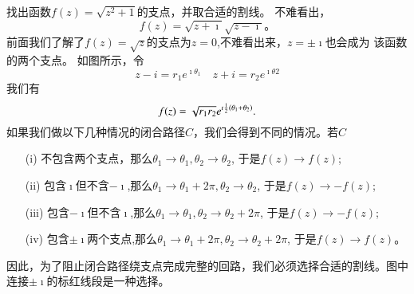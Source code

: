 \begin{examplebox}{找出函数$f(z) = \sqrt{z^2 + 1}$的支点，并取合适的割线。}
不难看出，
\[
  f(z) = \sqrt{z + \imath} \sqrt{z-\imath} 。
\]
前面我们了解了$f(z)=\sqrt{z}$的支点为$z=0$,不难看出来，$z=\pm \imath$也会成为
该函数的两个支点。
如图所示，令
\[ z - i = r_1 e^{\imath \theta_1 } \quad 
    z + i = r_2 e^{\imath \theta 2}
\]
我们有\[f(z) = \sqrt{r_1 r_2} e^{\imath \frac{1}{2} (\theta_1 + \theta_2)}.\]
如果我们做以下几种情况的闭合路径$C$，我们会得到不同的情况。若$C$
\begin{enumerate}
    \item[(i)] 不包含两个支点，那么$\theta_1 \to \theta_1, \theta_2 \to \theta_2$, 于是$f(z)\to f(z)$;
    \item[(ii)] 包含$\imath$但不含$-\imath$,那么$\theta_1 \to \theta_1 + 2\pi, \theta_2 \to \theta_2$, 于是$f(z)\to - f(z)$;
    \item[(iii)] 包含$-\imath$但不含$\imath$,那么$\theta_1 \to \theta_1, \theta_2 \to \theta_2  + 2\pi$, 于是$f(z)\to - f(z)$;
    \item[(iv)] 包含$\pm \imath$两个支点,那么$\theta_1 \to \theta_1  + 2\pi, \theta_2 \to \theta_2  + 2\pi$, 于是$f(z)\to  f(z)$。
\end{enumerate}
    \centering
    
因此，为了阻止闭合路径绕支点完成完整的回路，我们必须选择合适的割线。图中连接$\pm \imath$的标红线段是一种选择。
\end{examplebox}